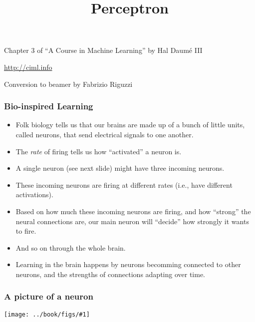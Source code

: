 \documentclass[trans]{beamer}
\title[Perceptron]
{Perceptron}
\institute[] %
{
}
\date{}
\newcommand{\myalert}[1]{{%
 #1}}
\begin{document}
\begin{frame}
\titlepage 
\vspace{-2cm}
\begin{center}
Chapter 3 of ``A Course in  Machine Learning'' by Hal Daum\'e III

\url{http://ciml.info}

Conversion to beamer by Fabrizio Riguzzi
\end{center}

\end{frame}
  \renewcommand{\concept}[1]{\myalert{#1}}
  \renewcommand{\koncept}[2]{\myalert{#1}}

\renewcommand{\Figure}[3]{%
    \begin{center}
    \texttt{[image: ../book/figs/\#1]}
    \end{center}
  }
  
\begin{frame}
  \frametitle{Bio-inspired Learning}
\begin{itemize}
\item Folk biology tells us that our brains are made up of a bunch of little
units, called \concept{neurons}, that send electrical signals to one
another.  
\item The \emph{rate} of firing tells us how ``activated'' a
neuron is. 
\item  A single neuron (see next slide) might have three incoming neurons. 
\item These
incoming neurons are firing at different rates (i.e., have different
\concept{activations}). 
\item Based on how much these incoming neurons are
firing, and how ``strong'' the neural connections are, our main neuron
will ``decide'' how strongly it wants to fire.
\item   And so on through the
whole brain. 
\item Learning in the brain happens by neurons becomming
connected to other neurons, and the strengths of connections adapting
over time.
\end{itemize}
\end{frame}

\begin{frame}
\frametitle{A picture of a neuron}
\Figure{perc:neuron}{a picture of a neuron}{0.45}
\end{frame}
\end{document}
